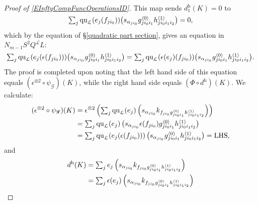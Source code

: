 \documentclass[11pt]{amsart} \renewcommand{\baselinestretch}{1.4}
\theoremstyle{plain}
\theoremstyle{definition}
\newcommand{\scrG}{\mathscr{G}}
\newcommand{\calL}{\mathcal{L}}
\newcommand{\call}{\mathcal{L}}
\newcommand{\BSW}{{\scrG}}
\newcommand{\quadratic}{\mathrm{qu}}
\newcommand{\uhor}{^\mathrm{h}}
\begin{document}
\begin{Operations in composite functor spectral sequences}
\begin{proof}[Proof of \ref{EInftyCompFuncOperationsID}]
This map sends $d\uhor_1(K)=0$ to %
\[
\textstyle\sum_j {\quadratic_\call}(e_j(f_{ji_0}))\smash{\left(s_{\alpha_{ji_0}} {g^{\smash{\langle} 0\smash{\rangle}}_{ji_0i_1}h^{\smash{\langle} 1\smash{\rangle}}_{ji_0i_1i_2}}\right)}=0, \]
which by the equation of \S\ref{quadratic part section}, gives an equation in $N_{m-1}S^2Q^{\calL}L$:
\[\textstyle\sum_j {\quadratic_\call}(e_j(\epsilon (f_{ji_0})))\smash{\left(s_{\alpha_{ji_0}} {g^{\smash{\langle} 0\smash{\rangle}}_{ji_0i_1}h^{\smash{\langle} 1\smash{\rangle}}_{ji_0i_1i_2}}\right)}
=
\textstyle\sum_j {\quadratic_\call}(\epsilon (e_j)(f_{ji_0}))\smash{\left(s_{\alpha_{ji_0}} {g^{\smash{\langle} 0\smash{\rangle}}_{ji_0i_1}h^{\smash{\langle} 1\smash{\rangle}}_{ji_0i_1i_2}}\right)}.
\]
The proof is completed upon noting that the left hand side of this equation equals $(\epsilon^{\otimes 2}\circ \psi_\BSW)(K)$, while the right hand side equals $(\Phi\circ d\uhor)(K)$. We calculate:
\begin{alignat*}{2}
(\epsilon^{\otimes 2}\circ \psi_\BSW)(K)
&=
\epsilon^{\otimes 2}\left(\textstyle\sum_j {\quadratic_\call}(e_j)\left(s_{\alpha_{ji_0}} k_{f\relax _{ji_0}g^{\smash{\langle} 0\smash{\rangle}}_{ji_0i_1}h^{\smash{\langle} 1\smash{\rangle}}_{ji_0i_1i_2}}\right)\right)%
\\
&=
\textstyle\sum_j {\quadratic_\call}(e_j)\left(s_{\alpha_{ji_0}} \epsilon(f\relax _{ji_0})g^{\smash{\langle} 0\smash{\rangle}}_{ji_0i_1}h^{\smash{\langle} 1\smash{\rangle}}_{ji_0i_1i_2}\right)%
\\
&=
\textstyle\sum_j {\quadratic_\call}(e_j(\epsilon (f_{ji_0})))\left(s_{\alpha_{ji_0}} g^{\smash{\langle} 0\smash{\rangle}}_{ji_0i_1}h^{\smash{\langle} 1\smash{\rangle}}_{ji_0i_1i_2}\right)=\textup{LHS},
\end{alignat*}
and
\begin{alignat*}{2}
d\uhor(K)
&=
\textstyle\sum_j e_j\left(s_{\alpha_{ji_0}} k_{f\relax _{ji_0}g^{\smash{\langle} 0\smash{\rangle}}_{ji_0i_1}h^{\smash{\langle} 1\smash{\rangle}}_{ji_0i_1i_2}}\right)%
\\
&=
\textstyle\sum_j \epsilon (e_j)\left(s_{\alpha_{ji_0}} k_{f\relax _{ji_0}g^{\smash{\langle} 0\smash{\rangle}}_{ji_0i_1}h^{\smash{\langle} 1\smash{\rangle}}_{ji_0i_1i_2}}\right)%

\end{alignat*}
\end{proof}
\end{Operations in composite functor spectral sequences}
\end{document}
